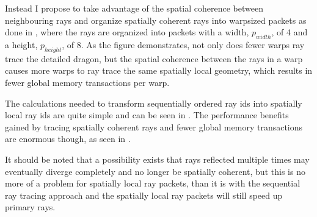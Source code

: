Instead I propose to take advantage of the spatial coherence between
neighbouring rays and organize spatially coherent rays into warpsized packets as
done in , where the rays are organized into packets
with a width, $p_{width}$, of 4 and a height, $p_{height}$, of 8. As the figure
demonstrates, not only does fewer warps ray trace the detailed dragon, but the
spatial coherence between the rays in a warp causes more warps to ray trace the
same spatially local geometry, which results in fewer global memory transactions
per warp.

\begin{figure}
  \hspace{20pt} 
  \caption[Sequantial and spatially coherent rays per warp.]{}
\end{figure}

The calculations needed to transform sequentially ordered ray ids into spatially
local ray ids are quite simple and can be seen in . The
performance benefits gained by tracing spatially coherent rays and fewer global
memory transactions are enormous though, as seen in
.

It should be noted that a possibility exists that rays reflected multiple times
may eventually diverge completely and no longer be spatially coherent, but this
is no more of a problem for spatially local ray packets, than it is with the
sequential ray tracing approach and the spatially local ray packets will still
speed up primary rays.

